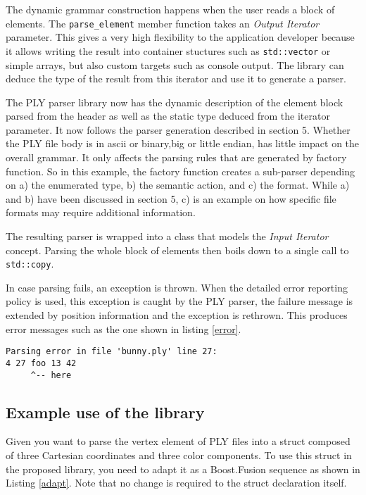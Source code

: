 The dynamic grammar construction happens when the user reads a block of
elements. The \texttt{parse\_element} member function takes an
\emph{Output Iterator} parameter. This gives a very high flexibility to the
application developer because it allows writing the result into container
stuctures such as \texttt{std::vector} or simple arrays, but also custom targets
such as console output. The library can deduce the type of the result from this
iterator and use it to generate a parser.

The PLY parser library now has the dynamic description of the element block
parsed from the header as well as the static type deduced from the iterator
parameter. It now follows the parser generation described in section 5.
Whether the PLY file body is in ascii or binary,big or little endian, has little
impact on the overall grammar. It only affects the parsing rules that are
generated by factory function. So in this example, the factory function creates
a sub-parser depending on a) the enumerated type, b) the semantic action, and c)
the format. While a) and b) have been discussed in section 5, c) is an example
on how specific file formats may require additional information.

The resulting parser is wrapped into a class that models the
\emph{Input Iterator} concept. Parsing the whole block of elements then boils
down to a single call to \texttt{std::copy}.

In case parsing fails, an exception is thrown. When the detailed error reporting
policy is used, this exception is caught by the PLY parser, the failure message
is extended by position information and the exception is rethrown. This produces
error messages such as the one shown in listing \ref{error}.

\begin{lstlisting}[label=error,frame=tb,caption=detailed parsing error message]
Parsing error in file 'bunny.ply' line 27:
4 27 foo 13 42
     ^-- here
\end{lstlisting}

\subsection{Example use of the library}

Given you want to parse the vertex element of PLY files into a struct composed
of three Cartesian coordinates and three color components. To use this struct in
the proposed library, you need to adapt it as a Boost.Fusion sequence as shown
in Listing \ref{adapt}. Note that no change is required to the struct
declaration itself.

